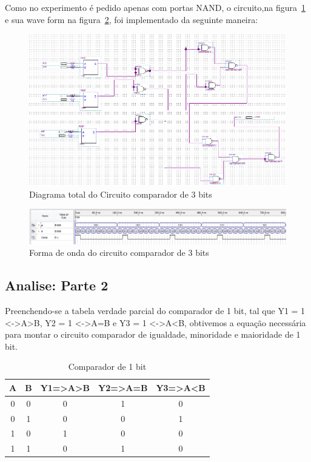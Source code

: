 \documentclass[12pt]{article}
\begin{document}
Como no experimento é pedido apenas com portas NAND, o circuito,na figura~\ref{fig:dtc3} e sua wave form na figura~\ref{fig:wf3}, foi implementado da seguinte maneira:
\begin{figure}[H]
	\centering
	\includegraphics[width=.5\textwidth]{dtcc3bits.png}
	\caption{Diagrama total do Circuito comparador de 3 bits}
	\label{fig:dtc3}
\end{figure}

\begin{figure}[H]
	\centering
	\includegraphics[width=.5\textwidth]{wfcc3bits.png}
	\caption{Forma de onda do circuito comparador de 3 bits}
	\label{fig:wf3}
\end{figure}

\subsection{Analise: Parte 2}

Preenchendo-se a tabela verdade parcial do comparador de 1 bit, tal que  Y1 = 1  \textless-\textgreater A\textgreater B, Y2 = 1 \textless-\textgreater  A=B e Y3 = 1 \textless-\textgreater A\textless B, obtivemos a equação necessária para montar o circuito comparador de igualdade, minoridade e maioridade de 1 bit.

\begin{table}[H]
	\centering
	\caption{Comparador de 1 bit}
	\begin{tabular}{|c|c|c|c|c|}
		\hline
		\multicolumn{1}{|c|}{A} & \multicolumn{1}{|c|}{B} & \multicolumn{1}{|c|}{Y1=\textgreater A\textgreater B} & \multicolumn{1}{|c|}{Y2=\textgreater A=B} & \multicolumn{1}{|c|}{Y3=\textgreater A\textless B} \\
		\hline
		0 & 0 & 0 & 1 & 0\\
		0 & 1 & 0 & 0 & 1\\
		1 & 0 & 1 & 0 & 0\\
		1 & 1 & 0 & 1 & 0\\
		\hline
	\end{tabular}
	\label{tab:c1b}
\end{table}
\end{document}
